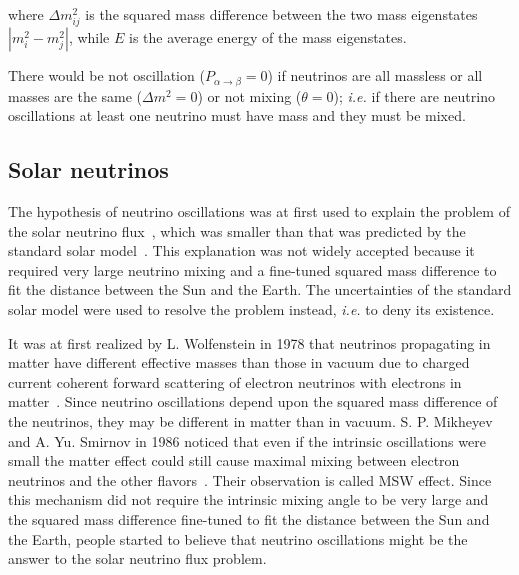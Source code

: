 where $\Delta m^{2}_{ij}$ is the squared mass difference between the
two mass eigenstates $|m^{2}_{i} - m^{2}_{j}|$, while $E$ is the
average energy of the mass eigenstates.

There would be not oscillation ($P_{\alpha \rightarrow \beta} = 0$) if neutrinos are all massless or all masses are the same ($\Delta m^{2} = 0$) or not mixing ($\theta = 0$); \textit{i.e.} if there are neutrino oscillations at least one neutrino must have mass and they must be mixed.

\subsection{Solar neutrinos}
\label{sec:solar}
The hypothesis of neutrino oscillations was at first used to explain the problem of the solar neutrino flux~\cite{Dav64,Dav68}, which was smaller than that was predicted by the standard solar model~\cite{Bah98}. This explanation was not widely accepted because it required very large neutrino mixing and a fine-tuned squared mass difference to fit the distance between the Sun and the Earth. The uncertainties of the standard solar model were used to resolve the problem instead, \textit{i.e.} to deny its existence.

It was at first realized by L. Wolfenstein in 1978 that neutrinos propagating in matter have different effective masses than those in vacuum due to charged current coherent forward scattering of electron neutrinos with electrons in matter~\cite{Wol78}. Since neutrino oscillations depend upon the squared mass difference of the neutrinos, they may be different in matter than in vacuum. S. P. Mikheyev and A. Yu. Smirnov in 1986 noticed that even if the intrinsic oscillations were small the matter effect could still cause maximal mixing between electron neutrinos and the other flavors~\cite{Mik86}. Their observation is called MSW effect. Since this mechanism did not require the intrinsic mixing angle to be very large and the squared mass difference fine-tuned to fit the distance between the Sun and the Earth, people started to believe that neutrino oscillations might be the answer to the solar neutrino flux problem.

